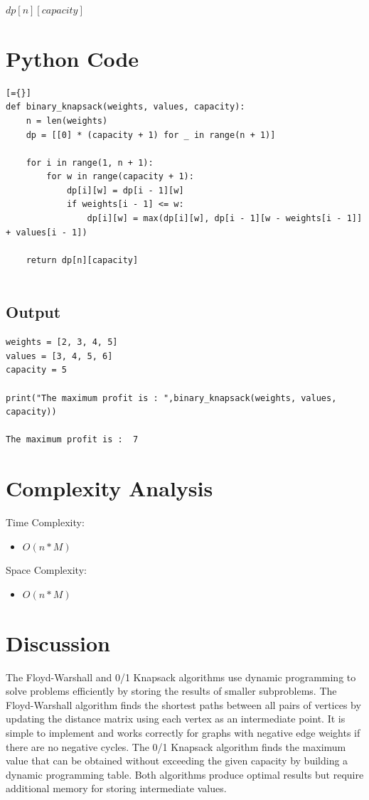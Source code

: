 \documentclass{article}
\begin{document}
{\begin{algorithm}
\begin{algorithmic}[1]
    \State \Return $dp[n][capacity]$
\EndFunction
\end{algorithmic}
\end{algorithm}
\pagebreak
\section*{Python Code}
\begin{lstlisting}[={}]
def binary_knapsack(weights, values, capacity):
    n = len(weights)
    dp = [[0] * (capacity + 1) for _ in range(n + 1)]

    for i in range(1, n + 1):
        for w in range(capacity + 1):
            dp[i][w] = dp[i - 1][w]
            if weights[i - 1] <= w:
                dp[i][w] = max(dp[i][w], dp[i - 1][w - weights[i - 1]] + values[i - 1])

    return dp[n][capacity]


\end{lstlisting}
\subsection*{Output}
\begin{lstlisting}
weights = [2, 3, 4, 5]
values = [3, 4, 5, 6]
capacity = 5

print("The maximum profit is : ",binary_knapsack(weights, values, capacity))

The maximum profit is :  7
\end{lstlisting}

\section*{Complexity Analysis}
Time Complexity:
\begin{itemize}
    \item $O(n * M)$
\end{itemize}
Space Complexity:
\begin{itemize}
    \item $O(n * M)$
\end{itemize}
\section*{Discussion}

The Floyd-Warshall and 0/1 Knapsack algorithms use dynamic programming to solve problems efficiently by storing the results of smaller subproblems. The Floyd-Warshall algorithm finds the shortest paths between all pairs of vertices by updating the distance matrix using each vertex as an intermediate point. It is simple to implement and works correctly for graphs with negative edge weights if there are no negative cycles. The 0/1 Knapsack algorithm finds the maximum value that can be obtained without exceeding the given capacity by building a dynamic programming table. Both algorithms produce optimal results but require additional memory for storing intermediate values.

}
\end{document}
